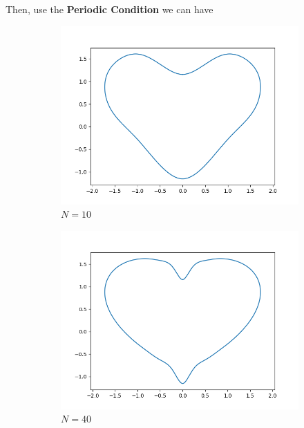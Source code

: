 \documentclass[a4paper]{article}
\begin{document}
Then, use the \textbf{Periodic Condition} we can have 
\begin{figure}[H]
    \centering
    \begin{subfigure}[b]{0.35\textwidth}
        \centering
        \includegraphics[width=\textwidth]{../figure/E_heart_cum_PP10.png}
        \caption{$N = 10$}
    \end{subfigure}
    \begin{subfigure}[b]{0.35\textwidth}
        \centering
        \includegraphics[width=\textwidth]{../figure/E_heart_cum_PP40.png}
        \caption{$N = 40$}
    \end{subfigure}
    \\ 
    \begin{subfigure}[b]{0.35\textwidth}

\end{subfigure}
\end{figure}
\end{document}
